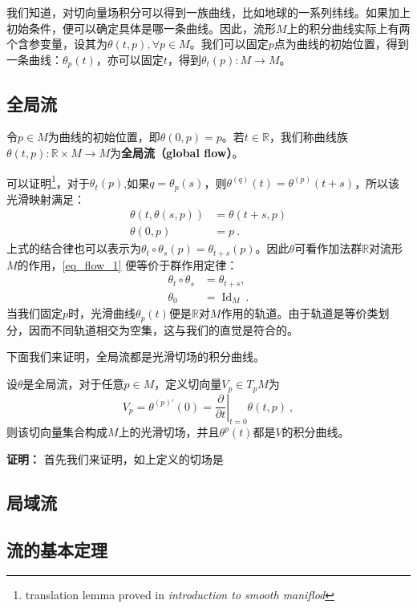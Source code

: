 我们知道，对切向量场积分可以得到一族曲线，比如地球的一系列纬线。如果加上初始条件，便可以确定具体是哪一条曲线。因此，流形$M$上的积分曲线实际上有两个含参变量，设其为$\theta(t,p),\forall p\in M$。我们可以固定$p$点为曲线的初始位置，得到一条曲线：$\theta_p(t)$，亦可以固定$t$，得到$\theta_t(p):M\rightarrow M$。
\subsection{全局流}
令$p\in M$为曲线的初始位置，即$\theta(0,p)=p$。若$t\in\mathbb R$，我们称曲线族$\theta(t,p):\mathbb R\times M\rightarrow M$为\textbf{全局流（global flow）}。

可以证明\footnote{translation lemma proved in \textsl{introduction to smooth maniflod}}，对于$\theta_t(p)$,如果$q=\theta_p(s)$，则$\theta^{(q)}(t)=\theta^{(p)}(t+s)$，所以该光滑映射满足：
\begin{equation}\label{eq_flow_1}
\begin{aligned}
\theta(t, \theta(s, p)) & =\theta(t+s, p) \\
\theta(0, p) & =p~.
\end{aligned}
\end{equation}
上式的结合律也可以表示为$\theta_t \circ \theta_s(p)=\theta_{t+s}(p)$。因此$\theta$可看作加法群$\mathbb R$对流形$M$的作用，\autoref{eq_flow_1} 便等价于群作用定律：
\begin{equation}
\begin{aligned}
\theta_t \circ \theta_s & =\theta_{t+s}, \\
\theta_0 & =\operatorname{Id}_M~.
\end{aligned}
\end{equation}
当我们固定$p$时，光滑曲线$\theta_p(t)$便是$\mathbb R$对$M$作用的轨道。由于轨道是等价类划分，因而不同轨道相交为空集，这与我们的直觉是符合的。

下面我们来证明，全局流都是光滑切场的积分曲线。
\begin{theorem}{}
设$\theta$是全局流，对于任意$p\in M$，定义切向量$V_p\in T_p M$为
\begin{equation}
V_p=\theta^{(p) \prime}(0)=\left.\frac{\partial}{\partial t}\right|_{t=0} \theta(t, p) ~,
\end{equation}
则该切向量集合构成$M$上的光滑切场，并且$\theta^p(t)$都是$V$的积分曲线。
\end{theorem}
\textbf{证明：}
首先我们来证明，如上定义的切场是
\subsection{局域流}
\subsection{流的基本定理}
